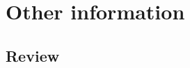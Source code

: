 \documentclass[letterpaper]{twentysecondcv} %
\begin{document}

\section{Other information}

\subsection{Review}








\end{document}
